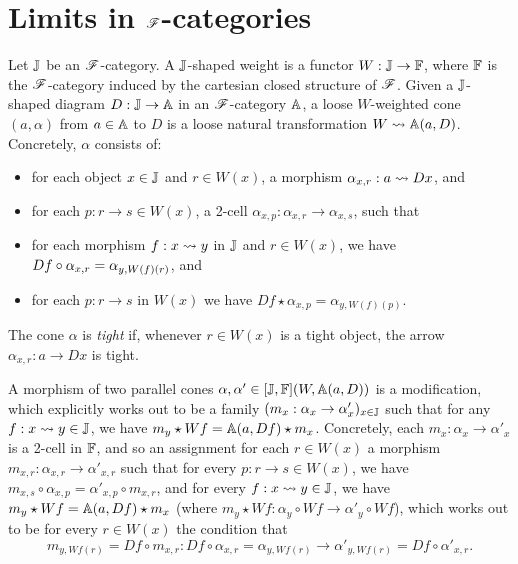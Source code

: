 \documentclass[../thesis.tex]{subfiles}
\begin{document}
  \section{Limits in \texorpdfstring{${\mathscr{F}}$}{F}-categories}

  \begin{definition}
    Let ${\mathbb{J}}$ be an ${\mathscr{F}}$-category. A ${\mathbb{J}}$-shaped weight is a functor $W : {\mathbb{J}} \to {\mathbb{F}}$, where ${\mathbb{F}}$
    is the ${\mathscr{F}}$-category induced by the cartesian closed structure of ${\mathscr{F}}$. Given a ${\mathbb{J}}$-shaped
    diagram $D : {\mathbb{J}} \to {\mathbb{A}}$ in an ${\mathscr{F}}$-category ${\mathbb{A}}$, a loose $W$-weighted cone $(a,\alpha)$
    from $a \in {\mathbb{A}}$ to $D$ is a loose natural transformation $W \rightsquigarrow {\mathbb{A}}(a,D)$. Concretely,
    $\alpha$ consists of:
    \begin{itemize}
      \item for each object $x \in {\mathbb{J}}$ and $r \in W(x)$, a morphism $\alpha_{x,r} : a \rightsquigarrow Dx$,
        and
      \item for each $p : r \to s \in W(x)$, a 2-cell $\alpha_{x,p} : \alpha_{x,r} \to \alpha_{x,s}$,
        such that
      \item for each morphism $f : x \rightsquigarrow y$ in ${\mathbb{J}}$ and $r \in W(x)$, we have $Df \circ \alpha_%
        {x,r} = \alpha_{y,W(f)(r)}$, and
      \item for each $p : r \to s$ in $W(x)$ we have $Df \star \alpha_{x,p} = \alpha_{y,W(f)(p)}$.
    \end{itemize} 
    The cone $\alpha$ is \emph{tight} if, whenever $r \in W(x)$ is a tight object, the arrow
    $\alpha_{x,r} : a \to Dx$ is tight.

    A morphism of two parallel cones $\alpha,\alpha' \in [{\mathbb{J}},{\mathbb{F}}](W,{\mathbb{A}}(a,D))$ is a modification,
    which explicitly works out to be a family $(m_x : \alpha_x \to \alpha'_x)_{x \in {\mathbb{J}}}$ such
    that for any $f : x \rightsquigarrow y \in {\mathbb{J}}$, we have $m_y \star Wf = {\mathbb{A}}(a,Df) \star m_x$. Concretely,
    each $m_x : \alpha_x \to \alpha'_x$ is a 2-cell in ${\mathbb{F}}$, and so an assignment for each
    $r \in W(x)$ a morphism $m_{x,r} : \alpha_{x,r} \to \alpha'_{x,r}$ such that for every $p :
    r \to s \in W(x)$, we have $m_{x,s} \circ \alpha_{x,p} = \alpha'_{x,p} \circ m_{x,r}$,
    and for every $f : x \rightsquigarrow y \in {\mathbb{J}}$, we have $m_y \star Wf = {\mathbb{A}}(a,Df) \star m_x$
    (where $m_y \star Wf : \alpha_y \circ Wf \to \alpha'_y \circ Wf$), which
    works out to be for every $r \in W(x)$ the condition that
    \[m_{y,Wf(r)} = Df \circ m_{x,r} : Df \circ \alpha_{x,r} = \alpha_{y,Wf(r)} \to \alpha'_{y,Wf(r)}
    = Df \circ \alpha'_{x,r}.\]
  \end{definition}
\end{document}

